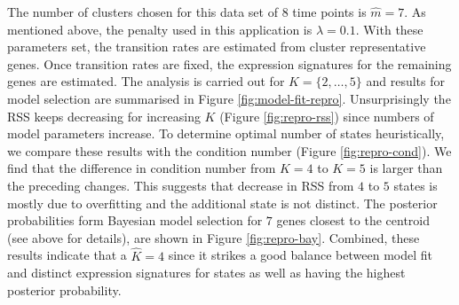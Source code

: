 The number of clusters chosen for this data set of $8$ time points is $\hat{m} = 7$. As mentioned above, the penalty used in this application is $\lambda = 0.1$. With these parameters set, the transition rates are estimated from cluster representative genes. Once transition rates are fixed, the expression signatures for the remaining genes are estimated. The analysis is carried out for $K = \lbrace 2, \ldots, 5 \rbrace $ and results for model selection are summarised in Figure \ref{fig:model-fit-repro}. Unsurprisingly the RSS keeps decreasing for increasing $K$ (Figure \ref{fig:repro-rss}) since numbers of model parameters increase. To determine optimal number of states heuristically, we compare these results with the condition number (Figure \ref{fig:repro-cond}). We find that the difference in condition number from $K=4$ to $K=5$ is larger than the preceding changes. This suggests that decrease in RSS from $4$ to $5$ states is mostly due to overfitting and the additional state is not distinct. The posterior probabilities form Bayesian model selection for $7$  genes closest to the centroid (see above for details), are shown in Figure \ref{fig:repro-bay}. Combined, these results indicate that a $\hat{K} = 4$ since it strikes a good balance between model fit and distinct expression signatures for states as well as having the highest posterior probability.

